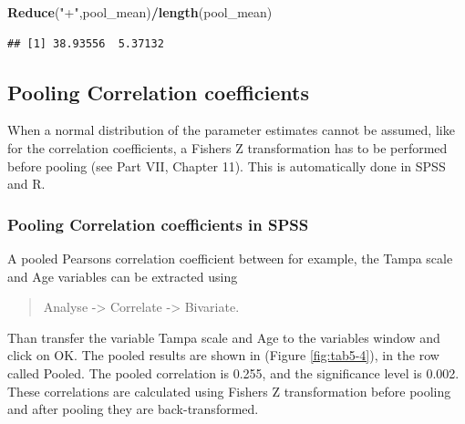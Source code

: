 \documentclass[
]{book}
\newenvironment{Shaded}{\begin{snugshade}}{\end{snugshade}}
\newcommand{\KeywordTok}[1]{\textcolor[rgb]{0.13,0.29,0.53}{\textbf{#1}}}
\newcommand{\NormalTok}[1]{#1}
\newcommand{\OperatorTok}[1]{\textcolor[rgb]{0.81,0.36,0.00}{\textbf{#1}}}
\newcommand{\StringTok}[1]{\textcolor[rgb]{0.31,0.60,0.02}{#1}}
\begin{document}
\begin{Shaded}
\begin{Highlighting}[]
\KeywordTok{Reduce}\NormalTok{(}\StringTok{"+"}\NormalTok{,pool_mean)}\OperatorTok{/}\KeywordTok{length}\NormalTok{(pool_mean)}
\end{Highlighting}
\end{Shaded}

\begin{verbatim}
## [1] 38.93556  5.37132
\end{verbatim}

\hypertarget{pooling-correlation-coefficients}{%
\subsection{Pooling Correlation coefficients}\label{pooling-correlation-coefficients}}

When a normal distribution of the parameter estimates cannot be assumed, like for the correlation coefficients, a Fishers Z transformation has to be performed before pooling (see Part VII, Chapter 11). This is automatically done in SPSS and R.

\hypertarget{pooling-correlation-coefficients-in-spss}{%
\subsubsection{Pooling Correlation coefficients in SPSS}\label{pooling-correlation-coefficients-in-spss}}

A pooled Pearsons correlation coefficient between for example, the Tampa scale and Age variables can be extracted using

\begin{quote}
Analyse -\textgreater{} Correlate -\textgreater{} Bivariate.
\end{quote}

Than transfer the variable Tampa scale and Age to the variables window and click on OK. The pooled results are shown in (Figure \ref{fig:tab5-4}), in the row called Pooled. The pooled correlation is 0.255, and the significance level is 0.002. These correlations are calculated using Fishers Z transformation before pooling and after pooling they are back-transformed.
\end{document}
